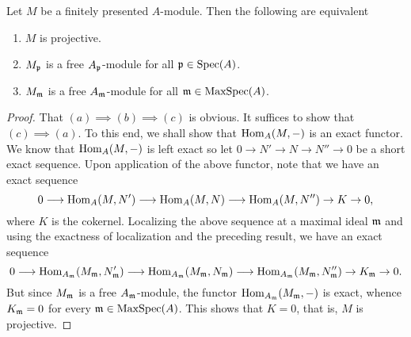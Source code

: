 \begin{theorem}
    Let $M$ be a finitely presented $A$-module. Then the following are equivalent
    \begin{enumerate}[label=(\alph*)]
        \item $M$ is projective. 
        \item $M_{\mathfrak{p}}$ is a free $A_{\mathfrak{p}}$-module for all $\mathfrak{p}\in\operatorname{Spec}(A)$.
        \item $M_{\mathfrak{m}}$ is a free $A_{\mathfrak{m}}$-module for all $\mathfrak{m}\in\operatorname{MaxSpec}(A)$.
    \end{enumerate}
\end{theorem}
\begin{proof}
    That $(a)\implies(b)\implies(c)$ is obvious. It suffices to show that $(c)\implies(a)$. To this end, we shall show that $\operatorname{Hom}_A(M,-)$ is an exact functor. We know that $\operatorname{Hom}_A(M,-)$ is left exact so let $0\to N'\to N\to N''\to 0$ be a short exact sequence. Upon application of the above functor, note that we have an exact sequence 
    \begin{equation*}
        0\longrightarrow\operatorname{Hom}_A(M, N')\longrightarrow\operatorname{Hom}_A(M, N)\longrightarrow\operatorname{Hom}_A(M, N'')\to K\to 0,
    \end{equation*}
    where $K$ is the cokernel. Localizing the above sequence at a maximal ideal $\mathfrak{m}$ and using the exactness of localization and the preceding result, we have an exact sequence 
    \begin{equation*}
        0\longrightarrow\operatorname{Hom}_{A_{\mathfrak{m}}}(M_{\mathfrak{m}}, N'_{\mathfrak{m}})\longrightarrow\operatorname{Hom}_{A_{\mathfrak{m}}}(M_{\mathfrak{m}}, N_{\mathfrak{m}})\longrightarrow\operatorname{Hom}_{A_{\mathfrak{m}}}(M_{\mathfrak{m}}, N''_{\mathfrak{m}})\to K_{\mathfrak{m}}\to 0.
    \end{equation*}
    But since $M_{\mathfrak{m}}$ is a free $A_{\mathfrak{m}}$-module, the functor $\operatorname{Hom}_{A_{\mathfrak{m}}}(M_{\mathfrak{m}},-)$ is exact, whence $K_{\mathfrak{m}} = 0$ for every $\mathfrak{m}\in\operatorname{MaxSpec}(A)$. This shows that $K = 0$, that is, $M$ is projective.
\end{proof}